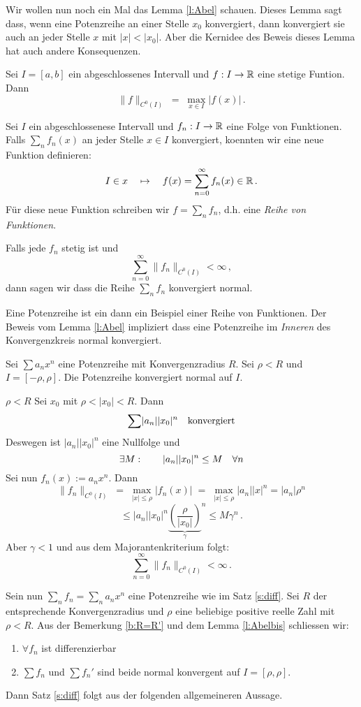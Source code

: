Wir wollen nun noch ein Mal das Lemma \ref{l:Abel} schauen. Dieses Lemma
sagt dass, wenn eine Potenzreihe an einer Stelle $x_0$ konvergiert, dann
konvergiert sie auch an jeder Stelle $x$ mit $|x|< |x_0|$. Aber die Kernidee
des Beweis dieses Lemma hat auch andere Konsequenzen.

\begin{Def}
 Sei $I=[a,b]$ ein abgeschlossenes Intervall und $f: I\to \mathbb{R}$ eine
stetige Funtion. Dann
\[
\|f\|_{C^0 (I)} \;=\; \max_{x\in I} |f(x)|\, .
\]
\end{Def}

\begin{Def}
Sei $I$ ein abgeschlossenese Intervall und $f_n: I \to \mathbb{R}$ eine Folge
von Funktionen. Falls $\sum_n f_n (x)$ an jeder Stelle $x\in I$ konvergiert,
koennten wir eine neue Funktion definieren:
\[
I\in x \quad \mapsto \quad f(x) = \sum_{n=0}^\infty f_n (x) \in \mathbb{R}\, . 
\]
F\"ur diese neue Funktion schreiben wir $f=\sum_n f_n$, d.h. eine
{\em Reihe von Funktionen}.

Falls jede $f_n$ stetig ist und
\[
\sum_{n=0}^\infty \|f_n\|_{C^0 (I)}<\infty\, ,
\]
dann sagen wir dass die Reihe $\sum_n f_n$ konvergiert normal.
\end{Def}

Eine Potenzreihe ist ein dann ein Beispiel einer Reihe von Funktionen.
Der Beweis vom Lemma \ref{l:Abel} impliziert dass eine Potenzreihe
im {\em Inneren} des Konvergenzkreis normal konvergiert.

\begin{Lem}\label{l:Abelbis}
  Sei $\sum a_nx^n$ eine Potenzreihe mit Konvergenzradius $R$. Sei $\rho<R$ und
$I= [-\rho, \rho]$. Die Potenzreihe konvergiert normal auf $I$.
\end{Lem}
\begin{Bew}
  $\rho <R$ Sei $x_0$ mit $\rho<|x_0|<R$. Dann
  \[\sum\mathopen| a_n \mathclose|\mathopen| x_0 \mathclose|^n\quad\text{konvergiert}\]
Deswegen ist $|a_n||x_0|^n$ eine Nullfolge und 
  \[\exists M : \qquad \mathopen| a_n \mathclose|\mathopen| x_0 \mathclose|^n\leq M\quad \forall n\]
Sei nun $f_n (x):= a_n x^n$.
Dann
\[
\|f_n\|_{C^0 (I)} \;=\; \max_{|x|\leq \rho} |f_n (x)|
\;=\; \max_{|x|\leq \rho} |a_n||x|^n = |a_n|\rho^n
\]
\[ 
\leq |a_n| |x_0|^n {\underbrace{\left(\frac{\rho}{|x_0|}\right)}_\gamma}^n
\leq M \gamma^n\, .
\]
Aber $\gamma<1$ und aus dem Majorantenkriterium folgt:
\[
\sum_{n=0}^\infty \|f_n\|_{C^0 (I)} <\infty\, .
\]
\end{Bew}
Sein nun $\sum_n f_n = \sum_n a_n x^n$ eine Potenzreihe wie
im Satz \ref{s:diff}. Sei $R$ der entsprechende Konvergenzradius 
und $\rho$ eine beliebige positive reelle Zahl mit $\rho<R$. 
Aus der Bemerkung \ref{b:R=R'} und dem Lemma \ref{l:Abelbis}
schliessen wir:
  \begin{enumerate}
    \item $\forall f_n$ ist differenzierbar
    \item $\sum f_n$ und $\sum f_n'$ sind beide normal konvergent auf $I=[\rho, \rho]$. 
  \end{enumerate}
Dann Satz \ref{s:diff} folgt aus der folgenden allgemeineren Aussage.

